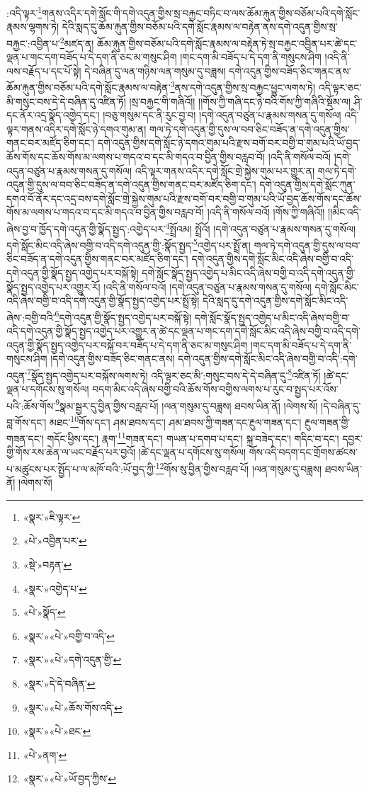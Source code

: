 :འདི་ལྟར་\footnote{«སྣར་»ཇི་ལྟར་}གནས་འདིར་དགེ་སློང་གི་དགེ་འདུན་གྱིས་སྲ་བརྐྱང་བཏིང་བ་ལས་ཆོམ་རྐུན་གྱིས་བཅོམ་པའི་དགེ་སློང་རྣམས་ལྷགས་ཏེ། དེའི་སླད་དུ་ཆོམ་རྐུན་གྱིས་བཅོམ་པའི་དགེ་སློང་རྣམས་ལ་བརྟེན་ནས་དགེ་འདུན་གྱིས་སྲ་བརྐྱང་:འབྱིན་པ་\footnote{«པེ་»འབྱིན་པར་}མཛད་ན། ཆོམ་རྐུན་གྱིས་བཅོམ་པའི་དགེ་སློང་རྣམས་ལ་བརྟེན་ཏེ་སྲ་བརྐྱང་འབྱིན་པར་ཚེ་དང་ལྡན་པ་གང་དག་བཟོད་པ་དེ་དག་ནི་ཅང་མ་གསུང་ཤིག །གང་དག་མི་བཟོད་པ་དེ་དག་ནི་གསུངས་ཤིག །འདི་ནི་ལས་བརྗོད་པ་དང་པོ་སྟེ། དེ་བཞིན་དུ་ལན་གཉིས་ལན་གསུམ་དུ་བཟླས། དགེ་འདུན་གྱིས་བཟོད་ཅིང་གནང་ནས་ཆོམ་རྐུན་གྱིས་བཅོམ་པའི་དགེ་སློང་རྣམས་ལ་བརྟེན་\footnote{«སྡེ་»བརྟན་}ནས་དགེ་འདུན་གྱིས་སྲ་བརྐྱང་ཕྱུང་ལགས་ཏེ། འདི་ལྟར་ཅང་མི་གསུང་བས་དེ་དེ་བཞིན་དུ་འཛིན་ཏོ། །སྲ་བརྐྱང་གི་གཞིའོ།། །།གོས་ཀྱི་གཞི་དང་ཉེ་བའི་གོས་ཀྱི་གཞིའི་སྡོམ་ལ། ཤི་དང་ནོར་འདྲ་སྣོད་འགྱེད་དང་། །བཅུ་གསུམ་དང་ནི་རུང་བྱ་བ། །དགེ་འདུན་བཙུན་པ་རྣམས་གསན་དུ་གསོལ། འདི་ལྟར་གནས་འདིར་དགེ་སློང་ཉེ་དགའ་གུམ་ན། གལ་ཏེ་དགེ་འདུན་གྱི་དུས་ལ་བབ་ཅིང་བཟོད་ན་དགེ་འདུན་གྱིས་གནང་བར་མཛོད་ཅིག་དང་། དགེ་འདུན་གྱིས་དགེ་སློང་ཉེ་དགའ་གུམ་པའི་རྫས་བགོ་བར་བགྱི་བ་གུམ་པའི་ཡོ་བྱད་ཆོས་གོས་དང་ཆོས་གོས་མ་ལགས་པ་གདའ་བ་དང་མི་གདའ་བ་བྱིན་གྱིས་བརླབ་བོ། །འདི་ནི་གསོལ་བའོ། །དགེ་འདུན་བཙུན་པ་རྣམས་གསན་དུ་གསོལ། འདི་ལྟར་གནས་འདིར་དགེ་སློང་གྲེ་སྐྱེས་གུམ་པར་གྱུར་ན། གལ་ཏེ་དགེ་འདུན་གྱི་དུས་ལ་བབ་ཅིང་བཟོད་ན་དགེ་འདུན་གྱིས་གནང་བར་མཛོད་ཅིག་དང་། དགེ་འདུན་གྱིས་དགེ་སློང་ཀུན་དགའ་བོ་ནོར་དང་འདྲ་བས་དགེ་སློང་གྲེ་སྐྱེས་གུམ་པའི་རྫས་བགོ་བར་བགྱི་བ་གུམ་པའི་ཡོ་བྱད་ཆོས་གོས་དང་ཆོས་གོས་མ་ལགས་པ་གདའ་བ་དང་མི་གདའ་བ་བྱིན་གྱིས་བརླབ་བོ། །འདི་ནི་གསོལ་བའོ། །གོས་ཀྱི་གཞིའོ།། །།མིང་འདི་ཞེས་བྱ་བ་ཁྱོད་དགེ་འདུན་གྱི་སྣོད་སྤྱད་:འགྱེད་པར་\footnote{«སྣར་»འགྱེད་པ་}སྤྲོའམ། སྤྲོའོ། །དགེ་འདུན་བཙུན་པ་རྣམས་གསན་དུ་གསོལ། དགེ་སློང་མིང་འདི་ཞེས་བགྱི་བ་འདི་དགེ་འདུན་གྱི་:སྣོད་སྤྱད་\footnote{«པེ་»སྣོད་}འགྱེད་པར་སྤྲོ་ན། གལ་ཏེ་དགེ་འདུན་གྱི་དུས་ལ་བབ་ཅིང་བཟོད་ན་དགེ་འདུན་གྱིས་གནང་བར་མཛོད་ཅིག་དང་། དགེ་འདུན་གྱིས་དགེ་སློང་མིང་འདི་ཞེས་བགྱི་བ་འདི་དགེ་འདུན་གྱི་སྣོད་སྤྱད་འགྱེད་པར་བསྐོ་སྟེ། དགེ་སློང་སྣོད་སྤྱད་འགྱེད་པ་མིང་འདི་ཞེས་བགྱི་བ་འདི་དགེ་འདུན་གྱི་སྣོད་སྤྱད་འགྱེད་པར་འགྱུར་རོ། །འདི་ནི་གསོལ་བའོ། །དགེ་འདུན་བཙུན་པ་རྣམས་གསན་དུ་གསོལ། དགེ་སློང་མིང་འདི་ཞེས་བགྱི་བ་འདི་དགེ་འདུན་གྱི་སྣོད་སྤྱད་འགྱེད་པར་སྤྲོ་སྟེ། དེའི་སླད་དུ་དགེ་འདུན་གྱིས་དགེ་སློང་མིང་འདི་ཞེས་:བགྱི་བའི་\footnote{«སྣར་»«པེ་»བགྱི་བ་འདི་}དགེ་འདུན་གྱི་སྣོད་སྤྱད་འགྱེད་པར་བསྐོ་སྟེ། དགེ་སློང་སྣོད་སྤྱད་འགྱེད་པ་མིང་འདི་ཞེས་བགྱི་བ་འདི་དགེ་འདུན་གྱི་སྣོད་སྤྱད་འགྱེད་པར་འགྱུར་ན་ཚེ་དང་ལྡན་པ་གང་དག་དགེ་སློང་མིང་འདི་ཞེས་བགྱི་བ་འདི་དགེ་འདུན་གྱི་སྣོད་སྤྱད་འགྱེད་པར་བསྐོ་བར་བཟོད་པ་དེ་དག་ནི་ཅང་མ་གསུང་ཤིག །གང་དག་མི་བཟོད་པ་དེ་དག་ནི་གསུངས་ཤིག །དགེ་འདུན་གྱིས་བཟོད་ཅིང་གནང་ནས། དགེ་འདུན་གྱིས་དགེ་སློང་མིང་འདི་ཞེས་བགྱི་བ་འདི་:དགེ་འདུན་\footnote{«སྣར་»«པེ་»དགེ་འདུན་གྱི་}སྣོད་སྤྱད་འགྱེད་པར་བསྐོས་ལགས་ཏེ། འདི་ལྟར་ཅང་མི་:གསུང་བས་དེ་དེ་བཞིན་དུ་\footnote{«སྣར་»དེ་དེ་བཞིན་}འཛིན་ཏོ། །ཚེ་དང་ལྡན་པ་དགོངས་སུ་གསོལ། བདག་མིང་འདི་ཞེས་བགྱི་བའི་ཆོས་གོས་བགྱིས་ལགས་པ་རུང་བ་སྤྱད་པར་འོས་པའི་:ཆོས་གོས་\footnote{«སྣར་»«པེ་»ཆོས་གོས་འདི་}སྣམ་སྦྱར་དུ་བྱིན་གྱིས་བརླབ་པོ། །ལན་གསུམ་དུ་བཟླས། ཐབས་ཡིན་ནོ། །ལེགས་སོ། །དེ་བཞིན་དུ་བླ་གོས་དང་། མཐང་\footnote{«སྣར་»«པེ་»ཐང་}གོས་དང་། ཤམ་ཐབས་དང་། ཤམ་ཐབས་ཀྱི་གཟན་དང་རྔུལ་གཟན་དང་། རྔུལ་གཟན་གྱི་གཟན་དང་། གདོང་ཕྱིས་དང་། རྣག་\footnote{«པེ་»ནག་}གཟན་དང་། གཡན་པ་དགབ་པ་དང་། སྐྲ་བཟེད་དང་། གདིང་བ་དང་། དབྱར་གྱི་གོས་རས་ཆེན་ལ་ཡང་བརྗོད་པར་བྱའོ། །ཚེ་དང་ལྡན་པ་དགོངས་སུ་གསོལ། གོས་འདི་བདག་དང་གྲོགས་ཚངས་པ་མཚུངས་པར་སྤྱོད་པ་ལ་མཁོ་བའི་:ཡོ་བྱད་ཀྱི་\footnote{«སྣར་»«པེ་»ཡོ་བྱད་ཀྱིས་}གོས་སུ་བྱིན་གྱིས་བརླབ་པོ། །ལན་གསུམ་དུ་བཟླས། ཐབས་ཡིན་ནོ། །ལེགས་སོ། 